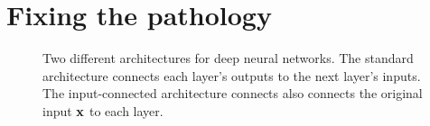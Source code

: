 \documentclass[twoside]{article}
\newcommand{\sectiondist}{}
\begin{document}
\section{Fixing the pathology}
\sectiondist
\label{sec:fix}

\begin{figure}

\caption{Two different architectures for deep neural networks.  The standard architecture connects each layer's outputs to the next layer's inputs.  The input-connected architecture connects also connects the original input ${\bf{x}}$ to each layer.}
\label{fig:input-connected}
\end{figure}
\end{document}
